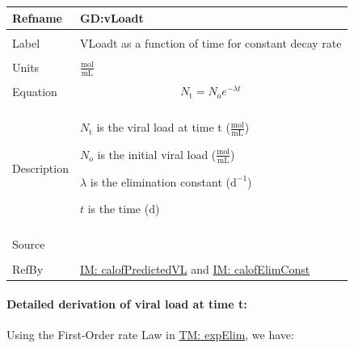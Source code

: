 \documentclass[12pt]{article}
\begin{document}
\vspace{\baselineskip}
\noindent
\begin{minipage}{\textwidth}
\begin{tabular}{>{\raggedright}p{}>{\raggedright\arraybackslash}p{}}
\toprule \textbf{Refname} & \textbf{GD:vLoadt}
\label{GD:vLoadt}
\\ \midrule \\
Label & VLoadt as a function of time for constant decay rate
        
\\ \midrule \\
Units & $\frac{\text{mol}}{\text{mL}}$
        
\\ \midrule \\
Equation & \begin{displaymath}
           {N_{\text{t}}}={N_{\text{o}}} e^{-λ t}
           \end{displaymath}
\\ \midrule \\
Description & \begin{symbDescription}
              \item{${N_{\text{t}}}$ is the viral load at time t ($\frac{\text{mol}}{\text{mL}}$)}
              \item{${N_{\text{o}}}$ is the initial viral load ($\frac{\text{mol}}{\text{mL}}$)}
              \item{$λ$ is the elimination constant ($\text{d}^{-1}$)}
              \item{$t$ is the time (${\text{d}}$)}
              \end{symbDescription}
\\ \midrule \\
Source & \cite{hobbie1970}
         
\\ \midrule \\
RefBy & \hyperref[IM:calofPredictedVL]{IM: calofPredictedVL} and \hyperref[IM:calofElimConst]{IM: calofElimConst}
        
\\ \bottomrule
\end{tabular}
\end{minipage}
\paragraph{Detailed derivation of viral load at time t:}
\label{GD:vLoadtDeriv}
Using the First-Order rate Law in \hyperref[TM:expElim]{TM: expElim}, we have:
\end{document}
